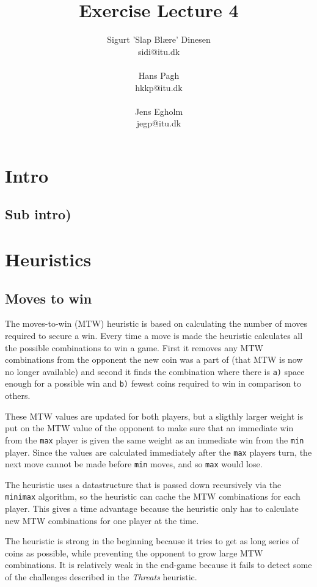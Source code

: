 \documentclass[a4paper, titlepage]{article}
\begin{document}
\title{Exercise Lecture 4}
\author{Sigurt 'Slap Blære' Dinesen \\sidi{@}itu.dk \\\\ Hans Pagh \\hkkp@itu.dk \\\\Jens
Egholm \\jegp@itu.dk}
\maketitle
\tableofcontents
\pagebreak

\section*{Intro}
\subsection*{Sub intro)}

\section*{Heuristics}

\subsection*{Moves to win}
The moves-to-win (MTW) heuristic is based on calculating the number of moves required to 
secure a win. Every time a move is made the heuristic calculates all the possible 
combinations to win a game. First it removes any MTW combinations from the opponent
the new coin was a part of (that MTW is now no longer available) and second it finds 
the combination where there is \texttt{a)} space enough for a possible win and 
\texttt{b)} fewest coins required to win in comparison to others.

These MTW values are updated for both players, but a sligthly larger weight is put on the 
MTW value of the opponent to make sure that an immediate win from the \texttt{max} player 
is given the same weight as an immediate win from the \texttt{min} player. Since the values 
are calculated immediately after the \texttt{max} players turn, the next move cannot be 
made before \texttt{min} moves, and so \texttt{max} would lose.

The heuristic uses a datastructure that is passed down recursively via the 
\texttt{minimax} algorithm, so the heuristic can cache the MTW combinations for each player.
This gives a time advantage because the heuristic only has to calculate new MTW 
combinations for one player at the time.

The heuristic is strong in the beginning because it tries to get as long series of coins
as possible, while preventing the opponent to grow large MTW combinations. It is 
relatively weak in the end-game because it fails to detect some of the challenges 
described in the \textit{Threats} heuristic.
\end{document}
